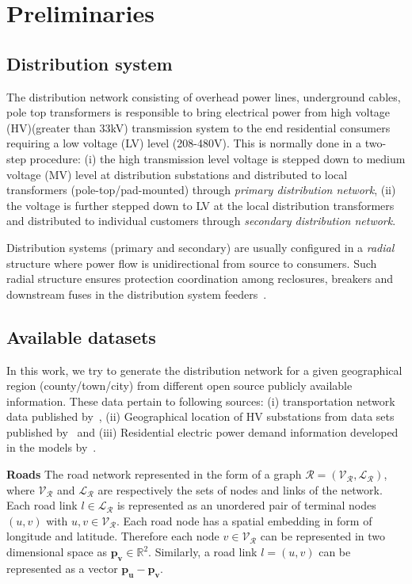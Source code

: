 \documentclass[sigconf]{acmart}
\begin{document}
\section{Preliminaries}\label{sec:prelim}
\subsection{Distribution system}\label{ssec:dist}
The distribution network consisting of overhead power lines, underground cables, pole top transformers is responsible to bring electrical power from high voltage (HV)(greater than 33kV) transmission system to the end residential consumers requiring a low voltage (LV) level (208-480V). This is normally done in a two-step procedure: (i) the high transmission level voltage is stepped down to medium voltage (MV) level at distribution substations and distributed to local transformers (pole-top/pad-mounted) through \emph{primary distribution network}, (ii) the voltage is further stepped down to LV at the local distribution transformers and distributed to individual customers through \emph{secondary distribution network}. 

Distribution systems (primary and secondary) are usually configured in a \emph{radial} structure where power flow is unidirectional from source to consumers. Such radial structure ensures protection coordination among reclosures, breakers and downstream fuses in the distribution system feeders~\cite{rad_prot}.

\subsection{Available datasets}\label{ssec:data}
In this work, we try to generate the distribution network for a given geographical region (county/town/city) from different open source publicly available information. These data pertain to following sources: (i) transportation network data published by~\cite{navteq}, (ii) Geographical location of HV substations from data sets published by~\cite{eia_substations} and (iii) Residential electric power demand information developed in the models by~\cite{swapna_2018}.

\noindent\textbf{Roads} The road network represented in the form of a graph $\mathcal{R}=(\mathcal{V_R},\mathcal{L_R})$, where $\mathcal{V_R}$ and $\mathcal{L_R}$ are respectively the sets of nodes and links of the network. Each road link $l\in\mathcal{L_R}$ is represented as an unordered pair of terminal nodes $(u,v)$ with $u,v\in\mathcal{V_R}$. Each road node has a spatial embedding in form of longitude and latitude. Therefore each node $v\in\mathcal{V_R}$ can be represented in two dimensional space as $\mathbf{p_v}\in\mathbb{R}^2$. Similarly, a road link $l=(u,v)$ can be represented as a vector $\mathbf{p_u}-\mathbf{p_v}$.
\end{document}
